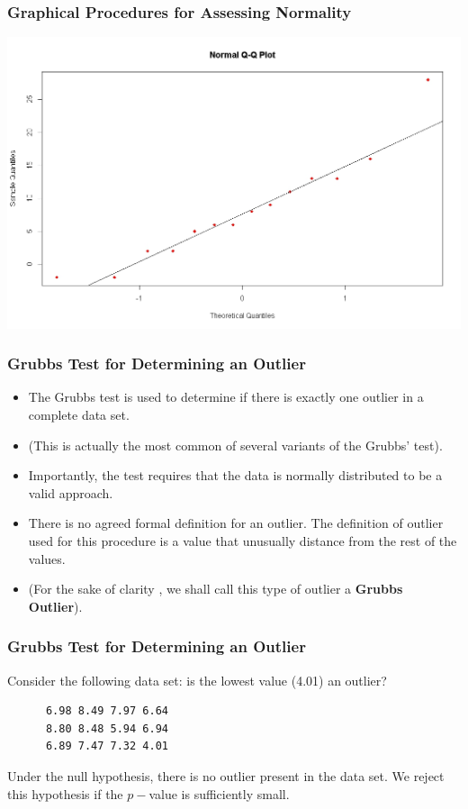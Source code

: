 \documentclass[a4]{beamer}
\begin{document}
\begin{frame}
\frametitle{Graphical Procedures for Assessing Normality}

\begin{center}
\includegraphics[scale=0.32]{10AQQplot}
\end{center}
\end{frame}
\begin{frame}[fragile]
\frametitle{Grubbs Test for Determining an Outlier}

\begin{itemize}
\item The Grubbs test is used to determine if there is exactly one outlier in a complete data set.
\item (This is actually the most common of several variants of the Grubbs' test).
\item Importantly, the test requires that the data is normally distributed to be a valid approach.
\item There is no agreed formal definition for an outlier. The definition of outlier used for this procedure is a value that unusually distance from the rest of the values.
\item (For the sake of clarity , we shall call this type of outlier a \textbf{Grubbs Outlier}). 
\end{itemize}
\end{frame}

\begin{frame}[fragile]
\frametitle{Grubbs Test for Determining an Outlier}
Consider the following data set: is the lowest value (4.01) an outlier?
\begin{verbatim}
      6.98 8.49 7.97 6.64
      8.80 8.48 5.94 6.94
      6.89 7.47 7.32 4.01
\end{verbatim}

Under the null hypothesis, there is no outlier present in the data set. 
We reject this hypothesis if the $p-$value is sufficiently small.
\end{frame}
\end{document}
